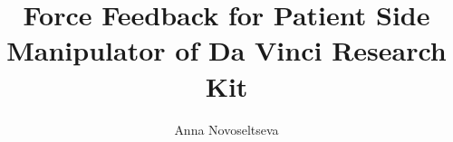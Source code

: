 \documentclass[12pt,letterpaper, oneside,final]{template/thesisClass}
\begin{document}
\title{Force Feedback for Patient Side Manipulator of Da Vinci Research Kit}
\author{Anna Novoseltseva}
\copyrightnotice










\begin{spacing}{1}
\def\dsp{\def\baselinestretch{1.25}\large\normalsize}


\end{spacing}
\end{document}
